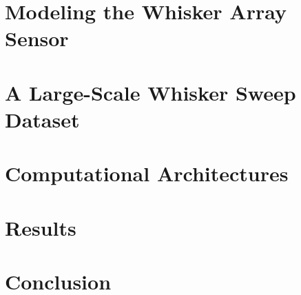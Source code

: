 \documentclass{article}
\begin{document}
\section{Modeling the Whisker Array Sensor} %


\section{A Large-Scale Whisker Sweep Dataset} %


\section{Computational Architectures} %


\section{Results} %


\section{Conclusion}  %




{\small
}

\end{document}
